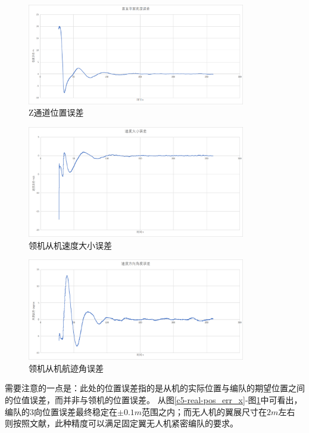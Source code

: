 \begin{figure}[H]
    \centering
    \includegraphics[width=0.85\textwidth]{figures/c5/c5-real-pos_err_z}
    \caption{Z通道位置误差}\label{c5-real-pos_err_z}
\end{figure}
\begin{figure}[H]
    \centering
    \includegraphics[width=0.85\textwidth]{figures/c5/c5-real-vel_err}
    \caption{领机从机速度大小误差}\label{c5-real-vel_err}
\end{figure}
\begin{figure}[H]
    \centering
    \includegraphics[width=0.85\textwidth]{figures/c5/c5-real-eta_err}
    \caption{领机从机航迹角误差}\label{c5-real-eta_err}
\end{figure}
需要注意的一点是：此处的位置误差指的是从机的实际位置与编队的期望位置之间的位值误差，而并非与领机的位置误差。
从图\ref{c5-real-pos_err_x}-图\ref{c5-real-pos_err_z}中可看出，编队的3向位置误差最终稳定在$\pm0.1m$范围之内；而无人机的翼展尺寸在$2m$左右
则按照文献\cite{Zhang2017Aerodynamics}，此种精度可以满足固定翼无人机紧密编队的要求。

